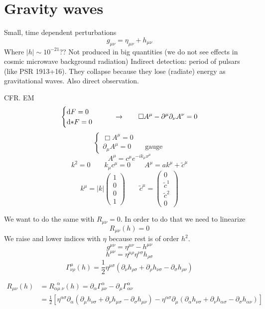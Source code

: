 \section{Gravity waves}
Small, time dependent perturbations
\[ g_{\mu\nu} = \eta_{\mu\nu} + h_{\mu\nu} \]
Where $\left|h\right|\sim 10^{-21}$??
Not produced in big quantities (we do not see effects in cosmic microwave background radiation)
Indirect detection: period of pulsars (like PSR 1913+16). They collapse because they lose (radiate) energy as gravitational waves. Also direct observation.

CFR. EM
\[ \begin{cases}
\operatorname{d \!}{F} = 0 \\ \operatorname{d \!}{*F} = 0
\end{cases} \qquad \to \qquad \Box A^\mu - \partial^\mu\partial_\nu A^\nu = 0 \]
\[ \begin{cases}
\Box A^\mu = 0 \\ \partial_\mu A^\mu = 0 \qquad \text{gauge}
\end{cases} \]
\[ A^\mu = c^\mu e^{-ik_\mu x^\mu} \]
\[ k^2 = 0 \qquad k_\mu c^\mu = 0 \qquad A^\mu = ak^\mu + \tilde{c}^\mu \]
\[ k^\mu = |k| \begin{pmatrix}
1\\0\\0\\1
\end{pmatrix} \qquad \tilde{c}^\mu = \begin{pmatrix}
0\\ \tilde{c}^1 \\ \tilde{c}^2 \\ 0
\end{pmatrix} \]


We want to do the same with $R_{\mu\nu} = 0$. In order to do that we need to linearize
\[ R_{\mu\nu}(h) = 0 \]
We raise and lower indices with $\eta$ because rest is of order $h^2$.
\[ g^{\mu\nu} = \eta^{\mu\nu} - h^{\mu\nu} \]
\[ h^{\mu\nu} = \eta^{\mu\rho}\eta^{\nu\sigma}h_{\rho\sigma} \]
\[\Gamma^\mu_{\nu\rho}(h) = \frac{1}{2}\eta^{\mu\sigma}\left(\partial_\nu h_{\rho\sigma} + \partial_\rho h_{\nu\sigma} - \partial_\sigma h_{\rho\nu}\right)\]

\begin{align*}
R_{\mu\nu}(h) &= R_{\alpha\mu\;\nu}^{\;\;\alpha}(h) = \partial_\alpha\Gamma^\alpha_{\mu\nu} - \partial_\mu\Gamma^\alpha_{\alpha\nu} \\
&= \frac{1}{2}\left[\eta^{\alpha\sigma}\partial_\alpha \left(\partial_\mu h_{\nu\sigma}+\partial_\nu h_{\mu\sigma}-\partial_\sigma h_{\mu\nu}\right)- \eta^{\alpha\sigma}\partial_\mu \left(\partial_\alpha h_{\nu\sigma}+\partial_\nu h_{\alpha\sigma}-\partial_\sigma h_{\alpha\nu}\right)\right]
\end{align*}

